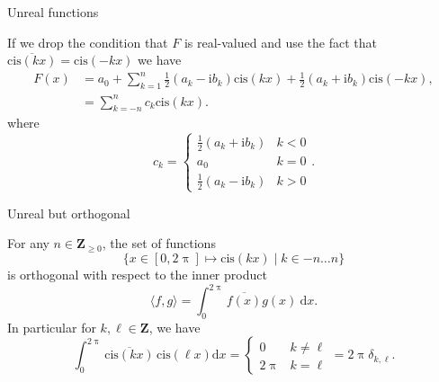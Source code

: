 \documentclass[portrait,fleqn,12pt]{beamer}
\newcommand{\integers}{\mathbf{Z}}
\newcommand{\cis}{\mathrm{cis}}
\newcommand{\imag}{\mathrm{i}}
\begin{document}
\begin{frame}{Unreal functions}

If we drop the condition that $F$ is real-valued and use the fact that $\overline{\cis(k x) } = \cis(-kx)$ we have
\begin{align*}
F(x)    &= a_0 + \sum_{k=1}^n \frac{1}{2} (a_k  - \imag b_k) \cis(k x) +   \frac{1}{2} (a_k  + \imag b_k) \cis(-k x) ,   \\
         &= \sum_{k=-n}^n c_k \cis(k x).
\end{align*}
where
\begin{equation*}
  c_k = \begin{cases} \frac{1}{2} (a_k  + \imag b_k) & k < 0 \\
                                       a_0 & k = 0 \\
                                       \frac{1}{2} (a_k  - \imag b_k) & k > 0
       \end{cases}.
\end{equation*}
\end{frame}

\begin{frame}{Unreal but orthogonal}

For any $n \in \integers_{\geq 0}$,  the set of functions
\begin{equation*}
  \{ x \in [0, 2 \uppi]  \mapsto \cis(k x) \mid k \in -n \dots n \}
\end{equation*}
is orthogonal with respect to the inner product
\begin{equation*}
  \langle f, g  \rangle = \int_0^{2 \uppi} \overline{f(x)} g(x) \ \mathrm{d} x.
\end{equation*}
In particular for $k, \ell \in \integers$, we have
\begin{equation*}
 \int_0^{2 \uppi}  \overline{ \cis(k x) } \, \cis(\ell x) \mathrm{d} x = \begin{cases} 0 & k \neq \ell \\ 2 \uppi & k = \ell \end{cases}
     = 2 \uppi \delta_{k, \ell}.
 \end{equation*}
\end{frame}
\end{document}
